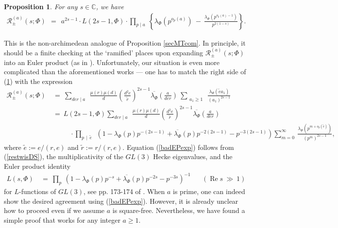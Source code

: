 \documentclass[11pt,reqno]{amsart}
\newtheorem{prop}[thm]{Proposition}
\theoremstyle{definition}
\theoremstyle{definition}
\theoremstyle{remark}
\newcommand{\C}{\ensuremath{\mathbb{C}}}
\numberwithin{equation}{section}
\DeclareMathOperator{\re}{Re}
\begin{document}
  
  \begin{prop}\label{agreewithCFK}
  	For any $s\in \C$, we have
  	\begin{align}
  		\mathcal{R}_{\pm}^{(a)}(s; \Phi)  \ \ =  \ \  	a^{2s-1} \cdot L(2s-1, \Phi)\cdot    \prod_{p\mid a} \ \left\{  \lambda_{\Phi}(p^{o_{p}(a)}) \ - \   \frac{\lambda_{\Phi}(p^{o_{p}(a)-1})}{p^{2(1-s)}}  \right\}. 
  	\end{align}
  \end{prop}
  

  
  This is the non-archimedean analogue of   Proposition \ref{secMTcom}. In principle, it should be a finite checking at the `ramified' places upon expanding $\mathcal{R}_{\pm}^{(a)}(s; \Phi)$  into an Euler product (as in  \cite{HY10, CIS19, BTB22+, HN22}). Unfortunately, our situation is even more complicated than the aforementioned works  ---  one has to match the right side of (\ref{agreewithCFK}) with the expression
  \begin{align}\label{badEPexp}
  	\mathcal{R}_{\pm}^{(a)}(s; \Phi) 
  	\ &= \   \sum_{der \mid a} \ \  \frac{\mu(r) \mu(d)}{d}  \left(\frac{d^{2}e  }{\widetilde{r}}\right)^{2s-1}  \overline{\lambda_{\Phi}}\left(\frac{a}{der}\right)   \ 
  	\sum_{\substack{a_{1}\ge 1 }}  \ \frac{ \lambda_{\Phi}(\widetilde{e}a_{1})}{ (a_{1})^{2s-1}} \nonumber\\
  	\ &= \ L(2s-1, \Phi)    \sum_{der \mid a} \ \  \frac{\mu(r) \mu(d)}{d}  \left(\frac{d^{2}e   }{\widetilde{r}}\right)^{2s-1}  \overline{\lambda_{\Phi}}\left(\frac{a}{der}\right)   \nonumber\\
  	&\hspace{30pt} \cdot  
  	\prod_{p \, \mid \, \widetilde{e}} \  \  \left(1-\lambda_{\Phi}(p)p^{-(2s-1)} +\overline{\lambda_{\Phi}}(p)p^{-2(2s-1)}-p^{-3(2s-1)}\right)\sum\limits_{m=0}^{\infty} \ \frac{\lambda_{\Phi}(p^{m+o_{p}(\widetilde{e})})}{(p^{m})^{2s-1}},
  \end{align}
  where  $\widetilde{e}:= e/(r,e)$ and $\widetilde{r}:= r/ (r,e)$.  Equation (\ref{badEPexp}) follows from   (\ref{restwisDS}), the  multiplicativity of the $GL(3)$ Hecke eigenvalues, and the Euler product identity
  \begin{align}\label{gl3EPid}
  	 L(s, \Phi) \ &= \  \prod_{p} \ \left(1-\lambda_{\Phi}(p)p^{-s} +\overline{\lambda_{\Phi}}(p)p^{-2s}-p^{-3s}\right)^{-1} \hspace{20pt} (\re s \ \gg \ 1)
  \end{align}
  for $L$-functions of $GL(3)$, see pp. 173-174 of \cite{Go15}.    When $a$ is prime, one can indeed show the desired agreement using (\ref{badEPexp}). However, it is already unclear how to proceed even if we assume  $a$ is square-free. Nevertheless,  we have found a simple proof that  works for any integer $a\ge 1$. 
  
\end{document}
